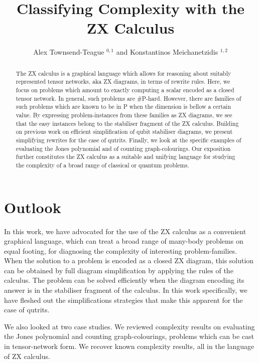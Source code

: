 \documentclass[submission,copyright,creativecommons]{eptcs}
\title{Classifying Complexity with the ZX Calculus}
\author{  Alex Townsend-Teague $^{0,1}$ and Konstantinos Meichanetzidis $^{1,2}$
\institute{$^0$ Mathematical Institute, University of Oxford}
\institute{$^1$ Department of Computer Science, University of Oxford}
\institute{$^2$ Cambridge Quantum Computing Ltd.} }
\begin{document}
\maketitle
\begin{abstract}
The ZX calculus is a graphical language which allows for reasoning about suitably represented tensor networks, aka ZX diagrams,
in terms of rewrite rules.
Here, we focus on problems which amount to exactly computing
a scalar encoded as a closed tensor network.
In general, such problems are \#P-hard.
However, there are families of such problems which are known to be in P
when the dimension is bellow a certain value.
By expressing problem-instances from these families as ZX diagrams,
we see that the easy instances belong to the stabiliser fragment of the ZX calculus.
Building on previous work on efficient simplification of qubit stabiliser diagrams, we present simplifying rewrites for the case of qutrits.
Finally, we look at the specific examples of evaluating the Jones polynomial
and of counting graph-colourings.
Our exposition further constitutes the ZX calculus as a suitable and unifying language for studying the complexity of
a broad range of classical or quantum problems.
\end{abstract}






\section{Outlook}


In this work, we have advocated for the use of the ZX calculus
as a convenient graphical language, which can treat a broad range of many-body problems on equal footing,
for diagnosing the complexity of interesting problem-families.
When the solution to a problem is encoded as a closed ZX diagram,
this solution can be obtained by full diagram simplification by applying the rules of the calculus.
The problem can be solved efficiently when the diagram encoding its answer is in the stabiliser fragment of the calculus.
In this work specifically, we have fleshed out the simplifications strategies that make this apparent for the case of qutrits.

We also looked at two case studies.
We reviewed complexity results on evaluating the Jones polynomial and counting graph-colourings, problems which can be cast in tensor-network form.
We recover known complexity results, all in the language of ZX calculus.
\end{document}
